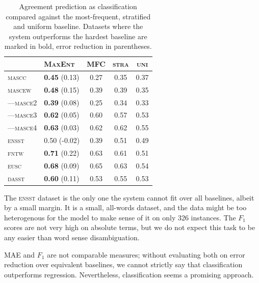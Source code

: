 \documentclass[11pt,a4paper]{article}
\begin{document}
\begin{table}[Ht!]

\begin{center}
  \begin{tabular}{ll|ccc}
 \toprule
 & \textsc{MaxEnt} & \textsc{MFC} & \textsc{stra} & \textsc{uni} \\
 \midrule
 \textsc{mascc} & \textbf{0.45} (0.13) & 0.27 & 0.35 & 0.37\\ 

 \textsc{mascew} & \textbf{0.48} (0.15)  & 0.39 & 0.39 & 0.35\\ 
---\textsc{masce2} & \textbf{0.39} (0.08) & 0.25 & 0.34 & 0.33\\ 
---\textsc{masce3} & \textbf{0.62} (0.05) & 0.60 & 0.57 & 0.53\\ 
---\textsc{masce4} & \textbf{0.63} (0.03)& 0.62 & 0.62 & 0.55\\ 
\textsc{ensst}  & 0.50 (-0.02) & 0.39 & 0.51 & 0.49\\ 
\textsc{fntw} & \textbf{0.71} (0.22) & 0.63 & 0.61 & 0.51\\ 

\textsc{eusc}  & \textbf{0.68} (0.09) & 0.65 & 0.63 & 0.54 \\
\textsc{dasst} & \textbf{0.60} (0.11) & 0.53 & 0.55 & 0.53\\ 

\bottomrule

  \end{tabular}  
\end{center}
\caption{Agreement prediction as classification compared against the most-frequent, stratified and uniform baseline. Datasets where the system outperforms the hardest baseline are marked in bold, error reduction in parentheses. \label{tab:classresults}}
\end{table} 

The \textsc{ensst} dataset is the only one the system cannot fit over all baselines, albeit by a small margin. It is a small, all-words dataset, and the data might be too heterogenous for the model to make sense of it on only 326 instances. The $F_1$ scores are not very high on absolute terms, but we do not expect this task to be any easier than word sense disambiguation. 

MAE and $F_1$ are not comparable measures; without evaluating both on error reduction over equivalent baselines, we cannot strictly say that classification outperforms regression. Nevertheless, classification seems a promising approach.
\end{document}
